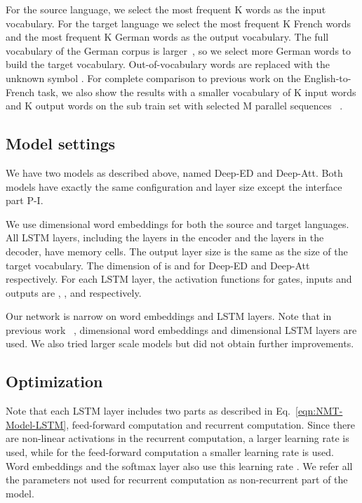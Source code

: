 \documentclass[11pt,letterpaper]{article}
\begin{document}
For the source language, we select the most frequent K words as the input vocabulary. For the target language we select the most frequent
K French words and the most frequent K German words as the output vocabulary. The full vocabulary of the German corpus is
larger~\cite{Jean-Bengio-ACL2015}, so we select more German words to build the target vocabulary. Out-of-vocabulary words are replaced with
the unknown symbol . For complete comparison to previous work on the English-to-French task, we also show the
results with a smaller vocabulary of K input words and K output words on the sub train set with selected M parallel sequences
~\cite{Schwenk-2014,Sutskever-Le-NIPS2014,Cho-Bengio-EMNLP2014}.


\subsection{Model settings}


We have two models as described above, named Deep-ED and Deep-Att. Both models have  exactly the same configuration and layer size  except the
interface part P-I.


We use  dimensional word embeddings for both the source and target languages.  All LSTM \mbox{layers}, including the  layers
in the encoder and the  layers in the decoder, have  memory cells. The output layer size is the same as the size of the target
vocabulary. The dimension of  is  and  for Deep-ED and Deep-Att respectively. For each LSTM layer, the activation functions
for gates, inputs and outputs are , , and  respectively.

Our network is narrow on word embeddings and LSTM layers. Note that in previous work ~\cite{Sutskever-Le-NIPS2014,Bahdanau-Bengio-ICLR2015},
 dimensional word embeddings and  dimensional \mbox{LSTM} layers are used. We also tried larger scale models but did not obtain
further improvements.


\subsection{Optimization}

Note that each LSTM layer includes two parts as described in Eq.~\ref{eqn:NMT-Model-LSTM}, feed-forward computation and recurrent computation.
\mbox{Since} there are non-linear activations in the recurrent computation, a larger learning rate  is used, while for the
feed-forward computation a smaller learning rate  is used. Word embeddings and the softmax layer also use this learning
rate . We refer all the parameters not used for recurrent computation as non-recurrent part of the model.
\end{document}
